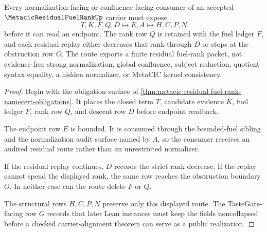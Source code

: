 \begin{theorem}
\label{thm:metacic-residual-fuel-rank-endpoint-route}
Every normalization-facing or confluence-facing consumer of an accepted $\MetacicResidualFuelRankUp$ carrier must expose
$$
T,K,F,Q,D \longmapsto E,A \longmapsto H,C,P,N
$$
before it can read an endpoint. The rank row $Q$ is retained with the fuel ledger $F$, and each residual replay either decreases that rank through $D$ or stops at the obstruction row $O$. The route exports a finite residual fuel-rank packet, not evidence-free strong normalization, global confluence, subject reduction, quotient syntax equality, a hidden normalizer, or MetaCIC kernel consistency.
\end{theorem}
\begin{proof}
Begin with the obligation surface of \autoref{thm:metacic-residual-fuel-rank-namecert-obligations}. It places the closed term $T$, candidate evidence $K$, fuel ledger $F$, rank row $Q$, and descent row $D$ before endpoint readback.

The endpoint row $E$ is bounded. It is consumed through the bounded-fuel sibling and the normalization audit surface named by $A$, so the consumer receives an audited residual route rather than an unrestricted normalizer.

If the residual replay continues, $D$ records the strict rank decrease. If the replay cannot spend the displayed rank, the same row reaches the obstruction boundary $O$. In neither case can the route delete $F$ or $Q$.

The structural rows $H,C,P,N$ preserve only this displayed route. The TasteGate-facing row $G$ records that later Lean instances must keep the fields noncollapsed before a checked carrier-alignment theorem can serve as a public realization.
\end{proof}



